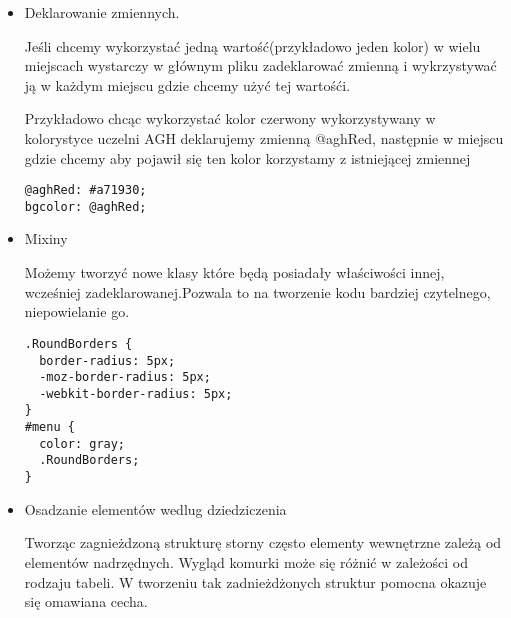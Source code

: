 \begin{itemize}
\item
Deklarowanie zmiennych.

Jeśli chcemy wykorzystać jedną wartość(przykładowo jeden kolor) w wielu miejscach wystarczy w głównym pliku zadeklarować zmienną i wykrzystywać ją w każdym miejscu gdzie chcemy użyć tej wartośći.

Przykładowo chcąc wykorzystać kolor czerwony wykorzystywany w kolorystyce uczelni AGH deklarujemy zmienną @aghRed, następnie w miejscu gdzie chcemy aby pojawił się ten kolor korzystamy z istniejącej zmiennej

\lstset{language=JavaScript}
\label{lis:webSql}
\begin{lstlisting}[caption=json]
@aghRed: #a71930;
bgcolor: @aghRed;
\end{lstlisting}

\item
Mixiny

Możemy tworzyć nowe klasy które będą posiadały właściwości innej, wcześniej zadeklarowanej.Pozwala to na tworzenie kodu bardziej czytelnego, niepowielanie go.


\lstset{language=JavaScript}
\label{lis:webSql}
\begin{lstlisting}[caption=json]
.RoundBorders {
  border-radius: 5px;
  -moz-border-radius: 5px;
  -webkit-border-radius: 5px;
}
#menu {
  color: gray;
  .RoundBorders;
}
\end{lstlisting}

\item
Osadzanie elementów wedlug dziedziczenia

Tworząc zagnieżdzoną strukturę storny często elementy wewnętrzne zależą od elementów nadrzędnych. Wygląd komurki może się różnić w zależości od rodzaju tabeli. W tworzeniu tak zadnieżdżonych struktur pomocna okazuje się omawiana cecha.

\end{itemize}